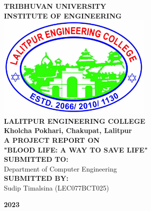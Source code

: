 {
	\thispagestyle{empty}
	\centering
   \fontsize{14pt}{14pt}\selectfont
        	\textbf{\MakeUppercase{Tribhuvan University}}\\
        	\textbf{\MakeUppercase{INSTITUTE OF ENGINEERING}}\\[0.5cm]
        	\includegraphics[width=3in]{images/LECLogo.jpg}\\[0.3cm]
        	\textbf{\MakeUppercase{Lalitpur Engineering College}}\\
    	\textbf{Kholcha Pokhari, Chakupat, Lalitpur}\\[1.4cm]
    	
    	\textbf{\MakeUppercase{A project report on}}\\
    	\textbf{"\MakeUppercase{{blood life}: A way to save life}"}\\
    	
    	\vspace{2cm}
    	\textbf{\MakeUppercase{Submitted To:}}\\
    	{Department of Computer Engineering}\\[1.2cm]
    	\textbf{\MakeUppercase{Submitted By:}}\\
            {
        	{{Sudip Timalsina (LEC077BCT025)}}\\
            }	
            
        \vspace{1.5cm}
    	\textbf{2023}\\
}
